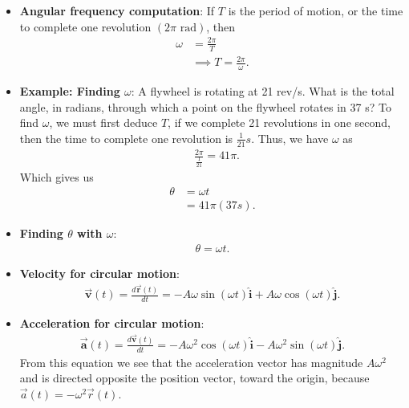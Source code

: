 \documentclass{report}
\begin{document}
\begin{itemize}
            \item \textbf{Angular frequency computation}:
                If $T$ is the period of motion, or the time to complete one revolution $(2\pi \text{ rad})$, then 
                \begin{align*}
                    \omega &= \frac{2\pi}{T} \\
                    &\implies T = \frac{2\pi}{\omega}
                .\end{align*}
            \item \textbf{Example: Finding $\omega$}: A flywheel is rotating at 21 rev/s. What is the total angle, in radians, through which a point on the flywheel rotates in 37 s?
                \bigbreak \noindent 
                To find $\omega$, we must first deduce $T$, if we complete 21 revolutions in one second, then the time to complete one revolution is $\frac{1}{21}s$. Thus, we have $\omega$ as 
                \begin{align*}
                    &\frac{2\pi}{\frac{1}{21}} = 41\pi
                .\end{align*}
                Which gives us 
                \begin{align*}
                    \theta  &= \omega t \\
                    &=41\pi(37s)
                .\end{align*}
            \item \textbf{Finding $\theta$ with $\omega$}:
                \begin{align*}
                    \theta  = \omega t
                .\end{align*}
            \item \textbf{Velocity for circular motion}:
                \begin{align*}
                    \vec{\mathbf{v}}(t) = \frac{d\vec{\mathbf{r}}(t)}{dt} = -A\omega\sin{(\omega t)}\hat{\mathbf{i}} + A\omega\cos{(\omega t)}\hat{\mathbf{j}}
                .\end{align*}
            \item \textbf{Acceleration for circular motion}:
                \begin{align*}
                    \vec{\mathbf{a}}(t) = \frac{d\vec{\mathbf{v}}(t)}{dt} = -A\omega^{2}\cos{(\omega t)}\hat{\mathbf{i}} - A\omega^{2}\sin{(\omega t)}\hat{\mathbf{j}}
                .\end{align*}
                From this equation we see that the acceleration vector has magnitude $A\omega^2$ and is directed opposite the position vector, toward the origin, because $\vec{a}(t) = -\omega^2 \vec{r}(t)$.

\end{itemize}
\end{document}
